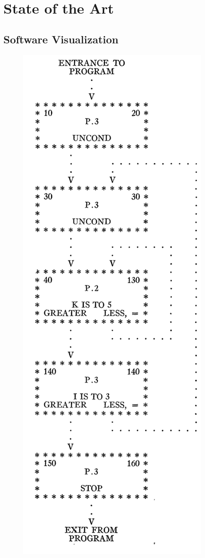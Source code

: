 
\chapter[State of the Art]{State of the Art}
\graphicspath{ {images/stateOfArt} }



\section{Software Visualization}


\begin{figure}
  \centering
  \includegraphics[width=0.9\linewidth]{Haibt1959_Flowchart.png} 

\end{figure}
